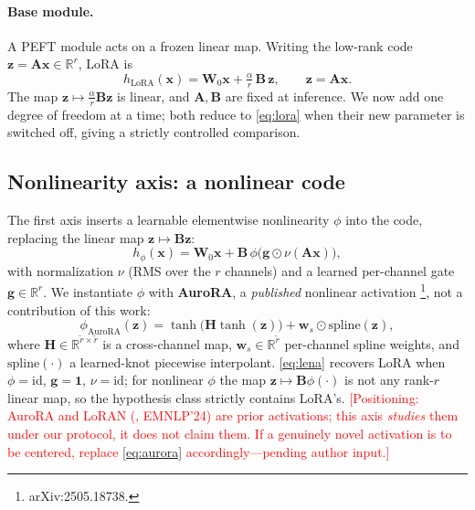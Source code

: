 \documentclass[preprint,11pt]{elsarticle}
\newcommand{\R}{\mathbb{R}}
\newcommand{\x}{\bm{x}}
\newcommand{\z}{\bm{z}}
\newcommand{\W}{\bm{W}}
\newcommand{\A}{\bm{A}}
\newcommand{\B}{\bm{B}}
\newcommand{\g}{\bm{g}}
\begin{document}
\paragraph{Base module.} A PEFT module acts on a frozen linear map. Writing the low-rank code $\z=\A\x\in\R^{r}$, LoRA is
\begin{equation}
h_{\text{LoRA}}(\x)=\W_0\x+\tfrac{\alpha}{r}\,\B\,\z,\qquad \z=\A\x.
\label{eq:lora}
\end{equation}
The map $\z\mapsto \tfrac{\alpha}{r}\B\z$ is linear, and $\A,\B$ are fixed at inference. We now add one degree of freedom at
a time; both reduce to \eqref{eq:lora} when their new parameter is switched off, giving a strictly controlled comparison.

\subsection{Nonlinearity axis: a nonlinear code}
The first axis inserts a learnable elementwise nonlinearity $\phi$ into the code, replacing the linear map $\z\mapsto\B\z$:
\begin{equation}
h_{\phi}(\x)=\W_0\x+\B\,\phi\!\big(\g\odot \nu(\A\x)\big),
\label{eq:lena}
\end{equation}
with normalization $\nu$ (RMS over the $r$ channels) and a learned per-channel gate $\g\in\R^{r}$. We instantiate $\phi$
with \textbf{AuroRA}, a \emph{published} nonlinear activation \citep{aurora}\footnote{arXiv:2505.18738.}, not a
contribution of this work:
\begin{equation}
\phi_{\text{AuroRA}}(\z)=\tanh\!\big(\bm{H}\tanh(\z)\big)+\bm{w}_s\odot \mathrm{spline}(\z),
\label{eq:aurora}
\end{equation}
where $\bm{H}\in\R^{\tilde r\times\tilde r}$ is a cross-channel map, $\bm{w}_s\in\R^{\tilde r}$ per-channel spline weights,
and $\mathrm{spline}(\cdot)$ a learned-knot piecewise interpolant. \eqref{eq:lena} recovers LoRA when $\phi=\mathrm{id}$,
$\g=\bm1$, $\nu=\mathrm{id}$; for nonlinear $\phi$ the map $\z\mapsto\B\phi(\cdot)$ is not any rank-$r$ linear map, so the
hypothesis class strictly contains LoRA's. \textcolor{red}{[Positioning: AuroRA and LoRAN (\citep{loran}, EMNLP'24) are
prior activations; this axis \emph{studies} them under our protocol, it does not claim them. If a genuinely novel
activation is to be centered, replace \eqref{eq:aurora} accordingly---pending author input.]}
\end{document}
